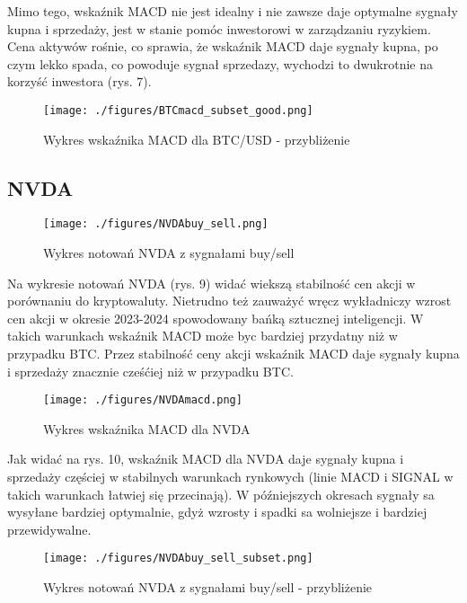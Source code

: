 \documentclass[a4paper,12pt]{article}  %
\begin{document}
Mimo tego, wskaźnik MACD nie jest idealny i nie zawsze daje optymalne sygnały
kupna i sprzedaży, jest w stanie pomóc inwestorowi w zarządzaniu ryzykiem.
Cena aktywów rośnie, co sprawia, że wskaźnik MACD daje sygnały kupna, po czym
lekko spada, co powoduje sygnał sprzedazy, wychodzi to dwukrotnie na korzyść
inwestora (rys. 7).

\begin{figure}[H]
  \centering
  \texttt{[image: ./figures/BTCmacd\_subset\_good.png]}
  \caption{Wykres wskaźnika MACD dla BTC/USD - przybliżenie}
\end{figure}

\pagebreak

\subsection{NVDA}

\begin{figure}[H]
  \centering
  \texttt{[image: ./figures/NVDAbuy\_sell.png]}
  \caption{Wykres notowań NVDA z sygnałami buy/sell}
\end{figure}

Na wykresie notowań NVDA (rys. 9) widać wiekszą stabilność cen akcji w
porównaniu do kryptowaluty. Nietrudno też zauważyć wręcz wykładniczy wzrost
cen akcji w okresie 2023-2024 spowodowany bańką sztucznej inteligencji. 
W takich warunkach wskaźnik MACD może byc bardziej przydatny niż w przypadku
BTC. Przez stabilność ceny akcji wskaźnik MACD daje sygnały kupna i sprzedaży
znacznie cześćiej niż w przypadku BTC.

\begin{figure}[H]
  \centering
  \texttt{[image: ./figures/NVDAmacd.png]}
  \caption{Wykres wskaźnika MACD dla NVDA}
\end{figure}

\pagebreak

Jak widać na rys. 10, wskaźnik MACD dla NVDA daje sygnały kupna i sprzedaży
częściej w stabilnych warunkach rynkowych (linie MACD i SIGNAL w takich
warunkach łatwiej się przecinają). W późniejszych okresach sygnały sa wysyłane 
bardziej optymalnie, gdyż wzrosty i spadki sa wolniejsze i bardziej
przewidywalne. 

\begin{figure}[H]
  \centering
  \texttt{[image: ./figures/NVDAbuy\_sell\_subset.png]}
  \caption{Wykres notowań NVDA z sygnałami buy/sell - przybliżenie}
\end{figure}
\end{document}
